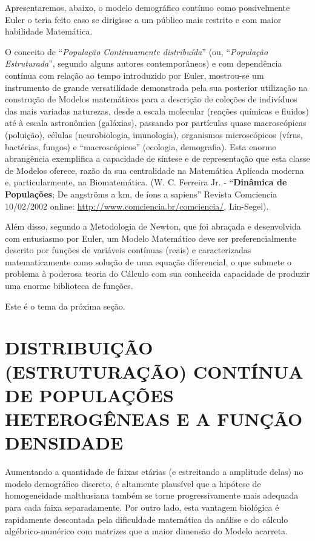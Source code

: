 Apresentaremos, abaixo, o modelo demográfico contínuo como possivelmente Euler o teria feito caso se dirigisse a um público mais restrito e com maior habilidade Matemática.

O conceito de ``\textit{População Continuamente distribuída}'' (ou, ``\textit{População Estruturada}'', segundo alguns autores contemporâneos) e com dependência contínua com relação ao tempo introduzido por Euler, mostrou-se um instrumento de grande versatilidade demonstrada pela sua posterior utilização na construção de Modelos matemáticos para a descrição de coleções de indivíduos das mais variadas naturezas, desde a escala molecular (reações químicas e fluidos) até à escala astronômica (galáxias), passando por partículas quase macroscópicas (poluição), células (neurobiologia, imunologia), organismos microscópicos (vírus, bactérias, fungos) e ``macroscópicos'' (ecologia, demografia). Esta enorme abrangência exemplifica a capacidade de síntese e de representação que esta classe de Modelos oferece, razão da sua centralidade na Matemática Aplicada moderna e, particularmente, na Biomatemática. (W. C. Ferreira Jr. - ``\textbf{Dinâmica de Populações}; De angströms a km, de íons a sapiens'' Revista Comciencia 10/02/2002 online: \href{http://www.comciencia.br/comciencia/}{http://www.comciencia.br/comciencia/}, Lin-Segel).

Além disso, segundo a Metodologia de Newton, que foi abraçada e desenvolvida com entusiasmo por Euler, um Modelo Matemático deve ser preferencialmente descrito por funções de variáveis contínuas (reais) e caracterizadas matematicamente como solução de uma equação diferencial, o que submete o problema à poderosa teoria do Cálculo com sua conhecida capacidade de produzir uma enorme biblioteca de funções.

Este é o tema da próxima seção.

\section{DISTRIBUIÇÃO (ESTRUTURAÇÃO) CONTÍNUA DE POPULAÇÕES HETEROGÊNEAS E A FUNÇÃO DENSIDADE}

Aumentando a quantidade de faixas etárias (e estreitando a amplitude delas) no modelo demográfico discreto, é altamente plausível que a hipótese de homogeneidade malthusiana também se torne progressivamente mais adequada para cada faixa separadamente. Por outro lado, esta vantagem biológica é rapidamente descontada pela dificuldade matemática da análise e do cálculo algébrico-numérico com matrizes que a maior dimensão do Modelo acarreta.

